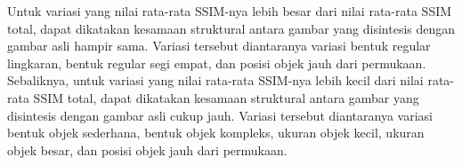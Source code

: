 Untuk variasi yang nilai rata-rata SSIM-nya lebih besar dari nilai rata-rata SSIM total, dapat dikatakan kesamaan struktural antara gambar yang disintesis dengan gambar asli hampir sama. 
Variasi tersebut diantaranya variasi bentuk regular lingkaran, bentuk regular segi empat, dan posisi objek jauh dari permukaan. 
Sebaliknya, untuk variasi yang nilai rata-rata SSIM-nya lebih kecil dari nilai rata-rata SSIM total, dapat dikatakan kesamaan struktural antara gambar yang disintesis dengan gambar asli cukup jauh. 
Variasi tersebut diantaranya variasi bentuk objek sederhana, bentuk objek kompleks, ukuran objek kecil, ukuran objek besar, dan posisi objek jauh dari permukaan.

